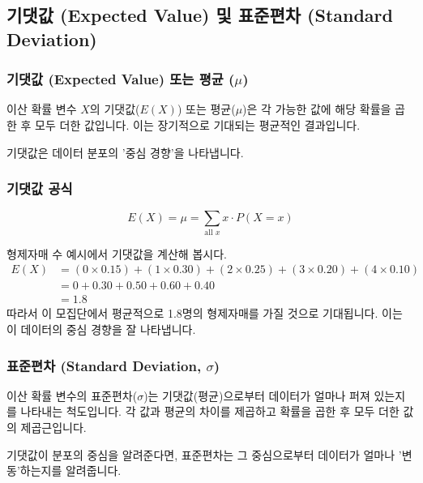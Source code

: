 \documentclass[11pt,a4paper]{book}
\theoremstyle{definition}
\begin{document}
\subsection{기댓값 (Expected Value) 및 표준편차 (Standard Deviation)}

\subsubsection*{기댓값 (Expected Value) 또는 평균 (\(\mu\))}

\begin{summarybox}[title={기댓값 핵심 요약}]
이산 확률 변수 \(X\)의 기댓값(\(E(X)\)) 또는 평균(\(\mu\))은 각 가능한 값에 해당 확률을 곱한 후 모두 더한 값입니다. 이는 장기적으로 기대되는 평균적인 결과입니다.
\end{summarybox}

기댓값은 데이터 분포의 '중심 경향'을 나타냅니다.

\subsubsection*{기댓값 공식}
\[ E(X) = \mu = \sum_{\text{all } x} x \cdot P(X=x) \]

\begin{examplebox}[title={기댓값 계산 예시: 형제자매 수}]
형제자매 수 예시에서 기댓값을 계산해 봅시다.
\begin{align*} E(X) &= (0 \times 0.15) + (1 \times 0.30) + (2 \times 0.25) + (3 \times 0.20) + (4 \times 0.10) \\ &= 0 + 0.30 + 0.50 + 0.60 + 0.40 \\ &= 1.8 \end{align*}
따라서 이 모집단에서 평균적으로 1.8명의 형제자매를 가질 것으로 기대됩니다. 이는 이 데이터의 중심 경향을 잘 나타냅니다.
\end{examplebox}

\subsubsection*{표준편차 (Standard Deviation, \(\sigma\))}

\begin{summarybox}[title={표준편차 핵심 요약}]
이산 확률 변수의 표준편차(\(\sigma\))는 기댓값(평균)으로부터 데이터가 얼마나 퍼져 있는지를 나타내는 척도입니다. 각 값과 평균의 차이를 제곱하고 확률을 곱한 후 모두 더한 값의 제곱근입니다.
\end{summarybox}

기댓값이 분포의 중심을 알려준다면, 표준편차는 그 중심으로부터 데이터가 얼마나 '변동'하는지를 알려줍니다.
\end{document}

